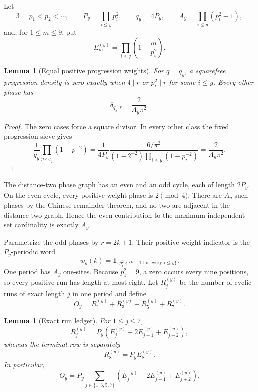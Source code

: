 \documentclass[11pt]{article}
\newtheorem{lemma}[theorem]{Lemma}
\theoremstyle{definition}
\theoremstyle{remark}
\newcommand{\dd}{\delta}
\begin{document}
Let
\begin{equation}
 3=p_1<p_2<\cdots,\qquad
 P_y=\prod_{i\le y}p_i^2,\qquad q_y=4P_y,\qquad
 A_y=\prod_{i\le y}(p_i^2-1),
 \label{eq:clock-def}
\end{equation}
and, for $1\le m\le9$, put
\begin{equation}
          E_m^{(y)}=\prod_{i\le y}\left(1-\frac{m}{p_i^2}\right).
 \label{eq:E-def}
\end{equation}

\begin{lemma}[Equal positive progression weights]
For $q=q_y$, a squarefree progression density is zero exactly when
$4\mid r$ or $p_i^2\mid r$ for some $i\le y$.  Every other phase has
\begin{equation}
                    \dd_{q_y,r}=\frac{2}{A_y\pi^2}.
 \label{eq:equal-density}
\end{equation}
\end{lemma}

\begin{proof}
The zero cases force a square divisor.  In every other class the fixed
progression sieve gives
\[
 \frac1{q_y}\prod_{p\nmid q_y}(1-p^{-2})
 =\frac1{4P_y}\frac{6/\pi^2}
 {(1-2^{-2})\prod_{i\le y}(1-p_i^{-2})}
 =\frac2{A_y\pi^2}.
\]
\end{proof}

The distance-two phase graph has an even and an odd cycle, each of length
$2P_y$.  On the even cycle, every positive-weight phase is $2\pmod4$.
There are $A_y$ such phases by the Chinese remainder theorem, and no two are
adjacent in the distance-two graph.  Hence the even contribution to the
maximum independent-set cardinality is exactly $A_y$.

Parametrize the odd phases by $r=2k+1$.  Their positive-weight indicator is
the $P_y$-periodic word
\begin{equation}
 w_y(k)=\mathbf 1_{\{p_i^2\nmid 2k+1\text{ for every }i\le y\}}.
 \label{eq:word}
\end{equation}
One period has $A_y$ one-sites.  Because $p_1^2=9$, a zero occurs every nine
positions, so every positive run has length at most eight.  Let $R_j^{(y)}$
be the number of cyclic runs of exact length $j$ in one period and define
\[
                   O_y=R_1^{(y)}+R_3^{(y)}+R_5^{(y)}+R_7^{(y)}.
\]

\begin{lemma}[Exact run ledger]
For $1\le j\le7$,
\begin{equation}
 R_j^{(y)}=P_y\left(E_j^{(y)}-2E_{j+1}^{(y)}+E_{j+2}^{(y)}\right),
 \label{eq:run-count}
\end{equation}
whereas the terminal row is separately
\begin{equation}
                   R_8^{(y)}=P_yE_8^{(y)}.
 \label{eq:run-eight}
\end{equation}
In particular,
\begin{equation}
 O_y=P_y\sum_{j\in\{1,3,5,7\}}
 \left(E_j^{(y)}-2E_{j+1}^{(y)}+E_{j+2}^{(y)}\right).
 \label{eq:O-formula}
\end{equation}
\end{lemma}
\end{document}
